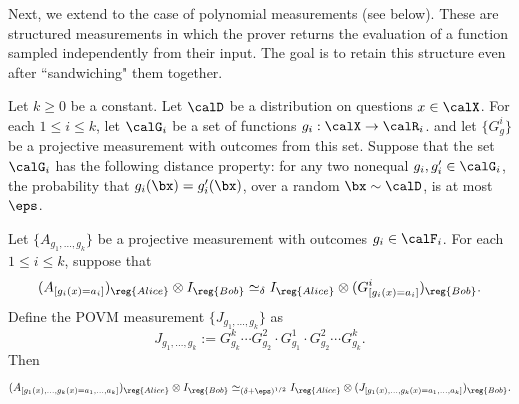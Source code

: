 Next, we extend  to the case of polynomial measurements (see  below).
These are structured measurements in which the prover returns the evaluation of a function sampled independently from their input.
The goal is to retain this structure even after ``sandwiching" them together.

\begin{fact}\label{fact:low-degree-sandwich}
Let $k \geq 0$ be a constant.
Let $\calD$ be a distribution on questions $x \in \calX$.
For each $1 \leq i \leq k$, let $\calG_i$ be a set of functions $g_i : \calX \rightarrow \calR_i$.
and let $\{G^i_g\}$ be a projective measurement with outcomes from this set.
Suppose that the set $\calG_i$ has the following distance property:
for any two nonequal $g_i, g_i' \in \calG_i$, the probability that $g_i(\bx) = g_i'(\bx)$, over a random $\bx \sim \calD$, is at most $\eps$.

Let $\{A_{g_1, \ldots, g_k}\}$ be a projective measurement with outcomes $g_i \in \calF_i$.
For each $1 \leq i \leq k$, suppose that
\begin{equation}\label{eq:treat-yo-self}
(A_{[g_i(x) = a_i]})_{\reg{Alice}} \otimes I_{\reg{Bob}} \simeq_{\delta} I_{\reg{Alice}} \otimes (G^i_{[g_i(x)=a_i]})_{\reg{Bob}}.
\end{equation}
Define the POVM measurement $\{J_{g_1, \ldots, g_k}\}$ as
\begin{equation*}
J_{g_1, \ldots, g_k} := G^k_{g_k} \cdots G^2_{g_2} \cdot G^1_{g_1} \cdot G^2_{g_2} \cdots G^k_{g_k}.
\end{equation*}
Then
\begin{equation*}
(A_{[g_1(x), \ldots, g_k(x) = a_1, \ldots, a_k]})_{\reg{Alice}} \otimes I_{\reg{Bob}} \simeq_{(\delta+\eps)^{1/2}} I_{\reg{Alice}} \otimes (J_{[g_1(x), \ldots, g_k(x) = a_1, \ldots, a_k]})_{\reg{Bob}}.
\end{equation*}
\end{fact}
